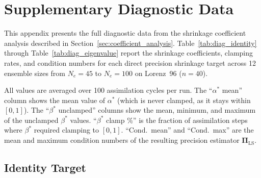 \appendix

\chapter{Supplementary Diagnostic Data}
\label{app:diagnostics}

This appendix presents the full diagnostic data from the shrinkage coefficient analysis described in Section~\ref{sec:coefficient_analysis}. Table~\ref{tab:diag_identity} through Table~\ref{tab:diag_eigenvalue} report the shrinkage coefficients, clamping rates, and condition numbers for each direct precision shrinkage target across 12 ensemble sizes from $N_e = 45$ to $N_e = 100$ on Lorenz~96 ($n = 40$).

All values are averaged over 100 assimilation cycles per run. The ``$\alpha^*$ mean'' column shows the mean value of $\alpha^*$ (which is never clamped, as it stays within $[0, 1]$). The ``$\beta^*$ unclamped'' columns show the mean, minimum, and maximum of the unclamped $\beta^*$ values. ``$\beta^*$ clamp \%'' is the fraction of assimilation steps where $\beta^*$ required clamping to $[0, 1]$. ``Cond.\ mean'' and ``Cond.\ max'' are the mean and maximum condition numbers of the resulting precision estimator $\boldsymbol{\Pi}_{\text{LS}}$.

\section{Identity Target}
\label{app:diag_identity}

